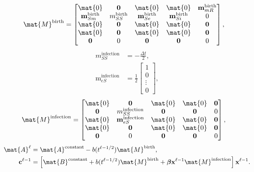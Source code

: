 \documentclass{jpmarticle}
\renewcommand{\vec}[1]{\boldsymbol{\mathrm{#1}}}
\begin{document}
\begin{equation}
  \begin{split}
    \mat{M}^{\text{birth}} &=
    \begin{bmatrix}
      \mat{0} & \vec{0} & \mat{0} & \mat{0} & \vec{m}_{mR}^{\text{birth}}
      \\
      \vec{m}_{Sm}^{\text{birth}} & m_{SS}^{\text{birth}} &
      \vec{m}_{Se}^{\text{birth}} & \vec{m}_{Si}^{\text{birth}} & 0
      \\
      \mat{0} & \vec{0} & \mat{0} & \mat{0} & \vec{0}
      \\
      \mat{0} & \vec{0} & \mat{0} & \mat{0} & \vec{0}
      \\
      \vec{0} & 0 & \vec{0} & \vec{0} & 0
    \end{bmatrix},
  \end{split}
\end{equation}
\begin{equation}
  \begin{split}
    m_{SS}^{\text{infection}} &=
    - \frac{\Delta t}{2},
    \\
    \vec{m}_{eS}^{\text{infection}} &=
    \frac{1}{2}
    \begin{bmatrix}
      1 \\ 0 \\ \vdots \\ 0
    \end{bmatrix},
  \end{split}
\end{equation}
\begin{equation}
  \begin{split}
    \mat{M}^{\text{infection}} &=
    \begin{bmatrix}
      \mat{0} & \vec{0} & \mat{0} & \mat{0} & \vec{0}
      \\
      \vec{0} & m_{SS}^{\text{infection}} & \vec{0} & \vec{0} & 0
      \\
      \mat{0} & \vec{m}_{eS}^{\text{infection}} & \mat{0} & \mat{0} & \vec{0}
      \\
      \mat{0} & \vec{0} & \mat{0} & \mat{0} & \vec{0}
      \\
      \vec{0} & 0 & \vec{0} & \vec{0} & 0
    \end{bmatrix},
  \end{split}
\end{equation}
\begin{equation}
  \begin{split}
    \mat{A}^{\ell} &=
    \mat{A}^{\text{constant}}
    - b(t^{\ell - 1 / 2}) \mat{M}^{\text{birth}},
    \\
    \vec{c}^{\ell - 1} &=
    \left[
      \mat{B}^{\text{constant}}
      + b(t^{\ell - 1 / 2}) \mat{M}^{\text{birth}}
      + \vec{\beta} \vec{x}^{\ell - 1} \mat{M}^{\text{infection}}
    \right] \vec{x}^{\ell - 1}.
  \end{split}
\end{equation}
\end{document}
